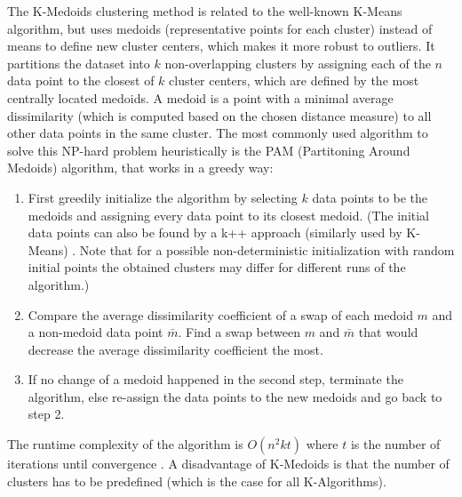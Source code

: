 
The K-Medoids clustering method is related to the well-known K-Means algorithm, but uses medoids (representative points for each cluster) instead of means to define new cluster centers, which makes it more robust to outliers\cite{Jin2010}. It partitions the dataset into $k$ non-overlapping clusters by assigning each of the $n$ data point to the closest of $k$ cluster centers, which are defined by the most centrally located medoids. A medoid is a point with a minimal average dissimilarity (which is computed based on the chosen distance measure) to all other data points in the same cluster. The most commonly used algorithm to solve this NP-hard problem heuristically is the PAM (Partitoning Around Medoids) algorithm, that works in a greedy way: \cite{kaufman2009finding} \\
\begin{enumerate}
	\item First greedily initialize the algorithm by selecting $k$ data points to be the medoids and assigning every data point to its closest medoid. (The initial data points can also be found by a k++ approach (similarly used by K-Means) \cite{scikit-learn-extra}. Note that for a possible  non-deterministic initialization with random initial points the obtained clusters may differ for different runs of the algorithm.) \\
	\item Compare the average dissimilarity coefficient of a swap of each medoid $m$ and a non-medoid data point $\bar{m}$. Find a swap between $m$ and $\bar{m}$ that would decrease the average dissimilarity coefficient the most. 
	\item If no change of a medoid happened in the second step, terminate the algorithm, else re-assign the data points to the new medoids and go back to step 2. 
\end{enumerate}

The runtime complexity of the algorithm is $O(n^2kt)$ where $t$ is the number of iterations until convergence  \cite{scikit-learn-extra}. A disadvantage of K-Medoids is that the number of clusters has to be predefined (which is the case for all K-Algorithms). 